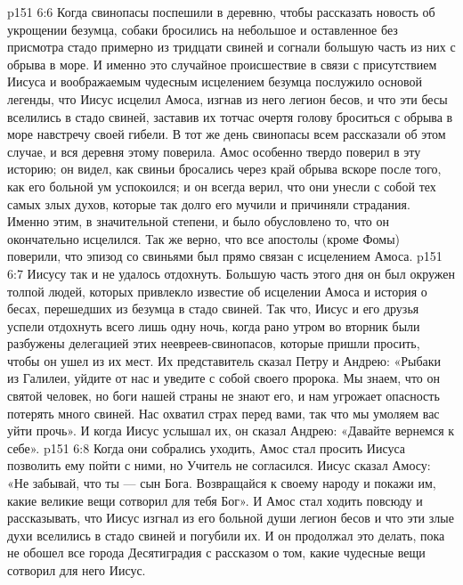 \vs p151 6:6 Когда свинопасы поспешили в деревню, чтобы рассказать новость об укрощении безумца, собаки бросились на небольшое и оставленное без присмотра стадо примерно из тридцати свиней и согнали большую часть из них с обрыва в море. И именно это случайное происшествие в связи с присутствием Иисуса и воображаемым чудесным исцелением безумца послужило основой легенды, что Иисус исцелил Амоса, изгнав из него легион бесов, и что эти бесы вселились в стадо свиней, заставив их тотчас очертя голову броситься с обрыва в море навстречу своей гибели. В тот же день свинопасы всем рассказали об этом случае, и вся деревня этому поверила. Амос особенно твердо поверил в эту историю; он видел, как свиньи бросались через край обрыва вскоре после того, как его больной ум успокоился; и он всегда верил, что они унесли с собой тех самых злых духов, которые так долго его мучили и причиняли страдания. Именно этим, в значительной степени, и было обусловлено то, что он окончательно исцелился. Так же верно, что все апостолы (кроме Фомы) поверили, что эпизод со свиньями был прямо связан с исцелением Амоса.
\vs p151 6:7 \pc Иисусу так и не удалось отдохнуть. Большую часть этого дня он был окружен толпой людей, которых привлекло известие об исцелении Амоса и история о бесах, перешедших из безумца в стадо свиней. Так что, Иисус и его друзья успели отдохнуть всего лишь одну ночь, когда рано утром во вторник были разбужены делегацией этих неевреев\hyp{}свинопасов, которые пришли просить, чтобы он ушел из их мест. Их представитель сказал Петру и Андрею: «Рыбаки из Галилеи, уйдите от нас и уведите с собой своего пророка. Мы знаем, что он святой человек, но боги нашей страны не знают его, и нам угрожает опасность потерять много свиней. Нас охватил страх перед вами, так что мы умоляем вас уйти прочь». И когда Иисус услышал их, он сказал Андрею: «Давайте вернемся к себе».
\vs p151 6:8 Когда они собрались уходить, Амос стал просить Иисуса позволить ему пойти с ними, но Учитель не согласился. Иисус сказал Амосу: «Не забывай, что ты --- сын Бога. Возвращайся к своему народу и покажи им, какие великие вещи сотворил для тебя Бог». И Амос стал ходить повсюду и рассказывать, что Иисус изгнал из его больной души легион бесов и что эти злые духи вселились в стадо свиней и погубили их. И он продолжал это делать, пока не обошел все города Десятиградия с рассказом о том, какие чудесные вещи сотворил для него Иисус.
